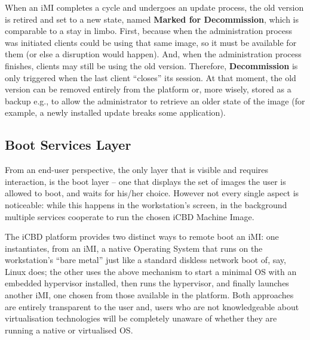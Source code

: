 When an iMI completes a cycle and undergoes an update process, the old version is retired and set to a new state, named \textbf{Marked for Decommission}, which is comparable to a stay in limbo. First, because when the administration process was initiated clients could be using that same image, so it must be available for them (or else a disruption would happen). And, when the administration process finishes, 
clients may still be using the old version. Therefore, \textbf{Decommission} is only triggered when the last client “closes” its session. At that moment, the old version can be removed entirely from the platform or, more wisely, stored as a backup e.g., to allow the administrator to retrieve an older state of the image (for example, a newly installed update breaks some application).




\subsection{Boot Services Layer}
\label{sub:icbd_boot_layer}


From an end-user perspective, the only layer that is visible and requires interaction, is the boot layer – one that displays the set of images the user is allowed to boot, and waits for his/her choice. However not every single aspect is noticeable: while this happens in the workstation’s screen, in the background multiple services cooperate to run the chosen iCBD Machine Image.

The iCBD platform provides two distinct ways to remote boot an iMI: one instantiates, from an iMI, a native Operating System that runs on the workstation’s “bare metal” just like a standard diskless network boot of, say, Linux does; the other uses the above mechanism to start a minimal OS with an embedded hypervisor installed, then runs the hypervisor, and finally launches another iMI, one chosen from those available in the platform. Both approaches are entirely transparent to the user and, users who are not knowledgeable about virtualisation technologies will be completely unaware of whether they are running a native or virtualised OS.

